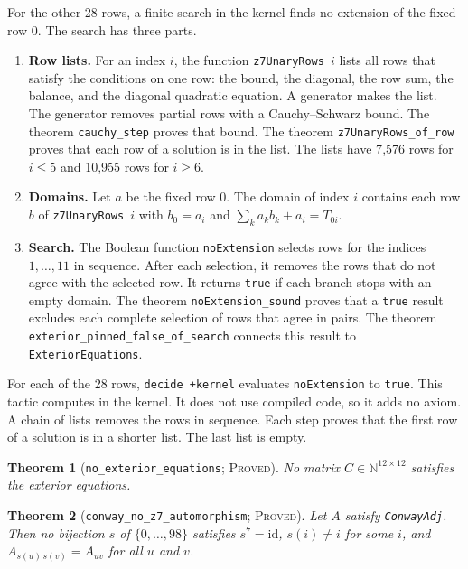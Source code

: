 \documentclass{article}
\theoremstyle{plain}
\newtheorem{theorem}{Theorem}[section]
\theoremstyle{definition}
\numberwithin{equation}{section}
\begin{document}
For the other 28 rows, a finite search in the kernel finds no extension of the fixed row 0. The search has three parts.
\begin{enumerate}
 \item \textbf{Row lists.} For an index $i$, the function \texttt{z7UnaryRows}~$i$ lists all rows that satisfy the conditions on one row: the bound, the diagonal, the row sum, the balance, and the diagonal quadratic equation. A generator makes the list. The generator removes partial rows with a Cauchy--Schwarz bound. The theorem \texttt{cauchy\_step} proves that bound. The theorem \texttt{z7UnaryRows\_of\_row} proves that each row of a solution is in the list. The lists have 7{,}576 rows for $i \le 5$ and 10{,}955 rows for $i \ge 6$.
 \item \textbf{Domains.} Let $a$ be the fixed row 0. The domain of index $i$ contains each row $b$ of \texttt{z7UnaryRows}~$i$ with $b_0 = a_i$ and $\sum_k a_k b_k + a_i = T_{0i}$.
 \item \textbf{Search.} The Boolean function \texttt{noExtension} selects rows for the indices $1, \dots, 11$ in sequence. After each selection, it removes the rows that do not agree with the selected row. It returns \texttt{true} if each branch stops with an empty domain. The theorem \texttt{noExtension\_sound} proves that a \texttt{true} result excludes each complete selection of rows that agree in pairs. The theorem \texttt{exterior\_pinned\_false\_of\_search} connects this result to \texttt{ExteriorEquations}.
\end{enumerate}
For each of the 28 rows, \texttt{decide +kernel} evaluates \texttt{noExtension} to \texttt{true}. This tactic computes in the kernel. It does not use compiled code, so it adds no axiom.
A chain of lists removes the rows in sequence. Each step proves that the first row of a solution is in a shorter list. The last list is empty.

\begin{theorem}[\texttt{no\_exterior\_equations}; \textsc{Proved}]
No matrix $C \in \mathbb{N}^{12 \times 12}$ satisfies the exterior equations.
\end{theorem}

\begin{theorem}[\texttt{conway\_no\_z7\_automorphism}; \textsc{Proved}]
\label{thm:no_z7}
Let $A$ satisfy \texttt{ConwayAdj}. Then no bijection $s$ of $\{0, \dots, 98\}$ satisfies $s^7 = \mathrm{id}$, $s(i) \ne i$ for some $i$, and $A_{s(u)\,s(v)} = A_{uv}$ for all $u$ and $v$.
\end{theorem}
\end{document}
